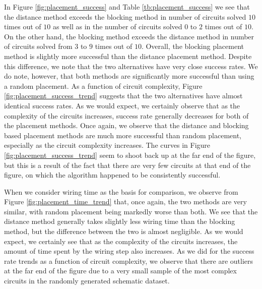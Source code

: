 In Figure \ref{fig:placement_success} and Table \ref{tb:placement_success} we
see that the distance method exceeds the blocking method in number of circuits
solved $10$ times out of $10$ as well as in the number of circuits solved $0$
to $2$ times out of $10$. On the other hand, the blocking method exceeds the
distance method in number of circuits solved from $3$ to $9$ times out
of $10$. Overall, the blocking placement method is slightly more successful
than the distance placement method. Despite this difference, we note that the
two alternatives have very
close success rates. We do note, however, that both methods are significantly
more successful than using a random placement. As a function of circuit
complexity, Figure
\ref{fig:placement_success_trend} suggests that the two alternatives have almost
identical success rates. As we would expect, we certainly observe that as the
complexity of the circuits
increases, success rate generally decreases for both of the placement methods.
Once again, we observe that the distance and blocking based placement methods
are much more successful than random placement, especially as the circuit
complexity increases.
The curves in Figure \ref{fig:placement_success_trend} seem to shoot back up
at the far end of the figure, but this is a result of the fact that there are
very few circuits at that end of the figure, on which the algorithm happened to
be consistently successful.

When we consider wiring time as the basis for comparison, we observe from
Figure \ref{fig:placement_time_trend} that, once again, the two methods are
very similar, with random placement being markedly worse than both.
We see that the distance method generally takes slightly less
wiring time than the blocking method, but the difference between the two is
almost negligible. As we would expect, we certainly see that as the complexity
of the circuits increases, the amount of time spent by the wiring step also
increases. As we did for the success rate trends as a function of circuit
complexity, we observe that there are outliers at the far end of the figure due
to a very small sample of the most complex circuits in the randomly generated
schematic dataset.

